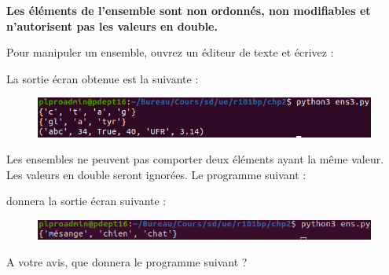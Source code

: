 \textbf{Les éléments de l'ensemble sont non ordonnés, non modifiables et n'autorisent pas les valeurs en double.}

Pour manipuler un ensemble, ouvrez un éditeur de texte et
écrivez :



La sortie écran obtenue est la suivante : 

\begin{figure}[H]
    \centering
    \includegraphics[scale = 0.7]{chapitre2/figures/ens3.png}
\end{figure}

\begin{tcolorbox}[lefttitle=2cm, colframe=gray!75!blue, title= \textbf{Tip for Code 4 : "\textit{Les duplications dans les ensembles}"}]

Les ensembles ne peuvent pas comporter deux éléments ayant la même valeur.
Les valeurs en double seront ignorées.
Le programme suivant :

donnera la sortie écran suivante :


\begin{figure}[H]
    \centering
    \includegraphics[scale = 0.7]{chapitre2/figures/ens.png}
\end{figure}

A votre avis, que donnera le programme suivant ?






\end{tcolorbox}


